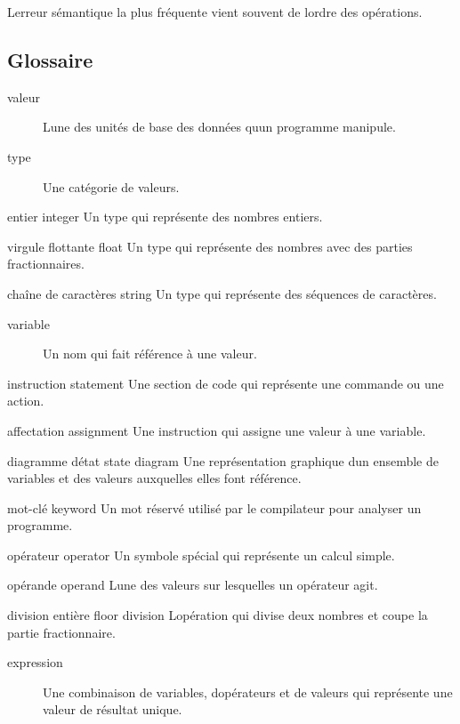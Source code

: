 L\textquotesingle erreur sémantique la plus fréquente vient souvent de
l\textquotesingle ordre des opérations.

\hypertarget{glossaire}{%
\subsection{Glossaire}\label{glossaire}}

\begin{description}
\item[valeur]
L\textquotesingle une des unités de base des données
qu\textquotesingle un programme manipule.
\item[type]
Une catégorie de valeurs.
\end{description}

entier integer Un type qui représente des nombres entiers.

virgule flottante float Un type qui représente des nombres avec des
parties fractionnaires.

chaîne de caractères string Un type qui représente des séquences de
caractères.

\begin{description}
\item[variable]
Un nom qui fait référence à une valeur.
\end{description}

instruction statement Une section de code qui représente une commande ou
une action.

affectation assignment Une instruction qui assigne une valeur à une
variable.

diagramme d\textquotesingle état state diagram Une représentation
graphique d\textquotesingle un ensemble de variables et des valeurs
auxquelles elles font référence.

mot-clé keyword Un mot réservé utilisé par le compilateur pour analyser
un programme.

opérateur operator Un symbole spécial qui représente un calcul simple.

opérande operand L\textquotesingle une des valeurs sur lesquelles un
opérateur agit.

division entière floor division L\textquotesingle opération qui divise
deux nombres et coupe la partie fractionnaire.

\begin{description}
\item[expression]
Une combinaison de variables, d\textquotesingle opérateurs et de valeurs
qui représente une valeur de résultat unique.
\end{description}

